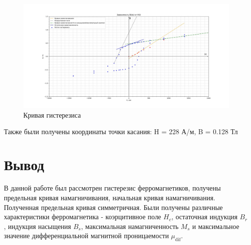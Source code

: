 \documentclass[a4paper, 12pt]{article}
\begin{document}
\begin{figure}[h!]
\begin{center}
\includegraphics[width = 1.2\textwidth]{TMf2sm6-Q9Y.jpg}
\end{center}
\caption{Кривая гистерезиса}
\end{figure}
Также были получены координаты точки касания: H = 228 А/м, B = 0.128 Тл

\newpage
\section{Вывод}
\hspace{0.6cm} В данной работе был рассмотрен гистерезис ферромагнетиков, получены предельная кривая намагничивания, начальная кривая намагничивания. Полученная предельная кривая симметричная. Были получены различные характеристики ферромагнетика - коэрцитивное поле $H_{c}$, остаточная индукция $B_{r}$, индукция насыщения $B_{s}$, максимальная намагниченность $M_{s}$ и максимальное значение дифференциальной магнитной проницаемости $\mu_\text{dif}$.
\end{document}
